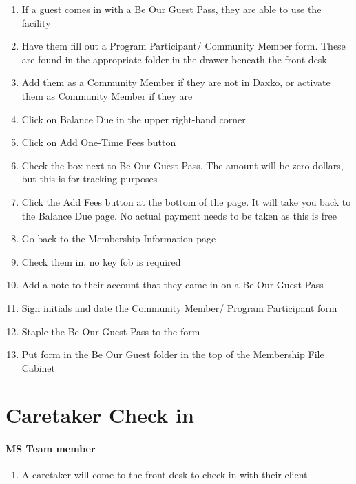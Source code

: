 \documentclass[
]{report}
\providecommand{\tightlist}{%
  \setlength{\itemsep}{0pt}\setlength{\parskip}{0pt}}\usepackage{longtable,booktabs,array}
\begin{document}
\begin{enumerate}
\def\labelenumi{\arabic{enumi}.}
\tightlist
\item
  If a guest comes in with a Be Our Guest Pass, they are able to use the
  facility
\item
  Have them fill out a Program Participant/ Community Member form. These
  are found in the appropriate folder in the drawer beneath the front
  desk
\item
  Add them as a Community Member if they are not in Daxko, or activate
  them as Community Member if they are
\item
  Click on Balance Due in the upper right-hand corner
\item
  Click on Add One-Time Fees button
\item
  Check the box next to Be Our Guest Pass. The amount will be zero
  dollars, but this is for tracking purposes
\item
  Click the Add Fees button at the bottom of the page. It will take you
  back to the Balance Due page. No actual payment needs to be taken as
  this is free
\item
  Go back to the Membership Information page
\item
  Check them in, no key fob is required
\item
  Add a note to their account that they came in on a Be Our Guest Pass
\item
  Sign initials and date the Community Member/ Program Participant form
\item
  Staple the Be Our Guest Pass to the form
\item
  Put form in the Be Our Guest folder in the top of the Membership File
  Cabinet
\end{enumerate}

\hypertarget{caretaker-check-in}{%
\chapter{Caretaker Check in}\label{caretaker-check-in}}

\hypertarget{ms-team-member-5}{%
\subsubsection{MS Team member}\label{ms-team-member-5}}

\begin{enumerate}
\def\labelenumi{\arabic{enumi}.}
\tightlist
\item
  A caretaker will come to the front desk to check in with their client
\end{enumerate}
\end{document}
